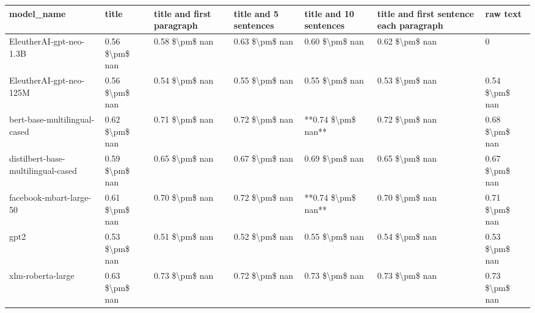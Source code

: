 \begin{tabular}{lllllll}
\toprule
                        model\_name &          title & title and first paragraph & title and 5 sentences & title and 10 sentences & title and first sentence each paragraph &       raw text \\
\midrule
           EleutherAI-gpt-neo-1.3B & 0.56 \$\textbackslash pm\$ nan &            0.58 \$\textbackslash pm\$ nan &        0.63 \$\textbackslash pm\$ nan &         0.60 \$\textbackslash pm\$ nan &                          0.62 \$\textbackslash pm\$ nan &              0 \\
           EleutherAI-gpt-neo-125M & 0.56 \$\textbackslash pm\$ nan &            0.54 \$\textbackslash pm\$ nan &        0.55 \$\textbackslash pm\$ nan &         0.55 \$\textbackslash pm\$ nan &                          0.53 \$\textbackslash pm\$ nan & 0.54 \$\textbackslash pm\$ nan \\
      bert-base-multilingual-cased & 0.62 \$\textbackslash pm\$ nan &            0.71 \$\textbackslash pm\$ nan &        0.72 \$\textbackslash pm\$ nan &     **0.74 \$\textbackslash pm\$ nan** &                          0.72 \$\textbackslash pm\$ nan & 0.68 \$\textbackslash pm\$ nan \\
distilbert-base-multilingual-cased & 0.59 \$\textbackslash pm\$ nan &            0.65 \$\textbackslash pm\$ nan &        0.67 \$\textbackslash pm\$ nan &         0.69 \$\textbackslash pm\$ nan &                          0.65 \$\textbackslash pm\$ nan & 0.67 \$\textbackslash pm\$ nan \\
           facebook-mbart-large-50 & 0.61 \$\textbackslash pm\$ nan &            0.70 \$\textbackslash pm\$ nan &        0.72 \$\textbackslash pm\$ nan &     **0.74 \$\textbackslash pm\$ nan** &                          0.70 \$\textbackslash pm\$ nan & 0.71 \$\textbackslash pm\$ nan \\
                              gpt2 & 0.53 \$\textbackslash pm\$ nan &            0.51 \$\textbackslash pm\$ nan &        0.52 \$\textbackslash pm\$ nan &         0.55 \$\textbackslash pm\$ nan &                          0.54 \$\textbackslash pm\$ nan & 0.53 \$\textbackslash pm\$ nan \\
                 xlm-roberta-large & 0.63 \$\textbackslash pm\$ nan &            0.73 \$\textbackslash pm\$ nan &        0.72 \$\textbackslash pm\$ nan &         0.73 \$\textbackslash pm\$ nan &                          0.73 \$\textbackslash pm\$ nan & 0.73 \$\textbackslash pm\$ nan \\
\bottomrule
\end{tabular}
